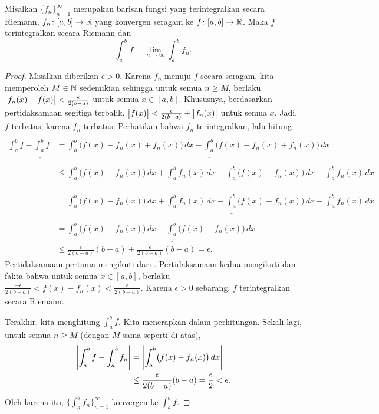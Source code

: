 \begin{thm} \label{integralinterchange:thm}
Misalkan $\{ f_n \}_{n=1}^\infty$ merupakan barisan fungsi yang terintegralkan secara Riemann,
$f_n \colon [a,b] \to {\mathbb{R}}$
yang konvergen seragam ke $f \colon [a,b]
\to {\mathbb{R}}$.  Maka $f$ terintegralkan secara Riemann dan
\begin{equation*}
\int_a^b f = \lim_{n\to\infty} \int_a^b f_n .
\end{equation*}
\end{thm}

\begin{proof}
Misalkan diberikan $\epsilon > 0$.
Karena $f_n$ menuju $f$ secara seragam, kita memperoleh $M \in {\mathbb{N}}$ sedemikian sehingga
untuk semua $n \geq M$, berlaku
$\bigl\lvert {f_n(x)-f(x)} \bigr\rvert < \frac{\epsilon}{2(b-a)}$ untuk semua $x \in [a,b]$.
Khususnya, berdasarkan pertidaksamaan segitiga terbalik,
$\bigl\lvert {f(x)} \bigr\rvert < \frac{\epsilon}{2(b-a)} + \bigl\lvert {f_n(x)} \bigr\rvert$ untuk semua $x$.
Jadi, $f$ terbatas,
karena $f_n$ terbatas.
Perhatikan bahwa $f_n$ terintegralkan, lalu hitung
\begin{equation*}
\begin{split}
\overline{\int_a^b} f
-
\underline{\int_a^b} f
& =
\overline{\int_a^b} \bigl( f(x) - f_n(x) + f_n(x) \bigr)\,dx
-
\underline{\int_a^b} \bigl( f(x) - f_n(x) + f_n(x) \bigr)\,dx
\\
& \leq
\overline{\int_a^b} \bigl( f(x) - f_n(x) \bigr)\,dx +  \overline{\int_a^b} f_n(x) \,dx
-
\underline{\int_a^b} \bigl( f(x) - f_n(x) \bigr)\,dx -  \underline{\int_a^b} f_n(x) \,dx
\\
& =
\overline{\int_a^b} \bigl( f(x) - f_n(x) \bigr)\,dx +  \int_a^b f_n(x) \,dx
-
\underline{\int_a^b} \bigl( f(x) - f_n(x) \bigr)\,dx -  \int_a^b f_n(x) \,dx
\\
& =
\overline{\int_a^b} \bigl( f(x) - f_n(x) \bigr)\,dx
-
\underline{\int_a^b} \bigl( f(x) - f_n(x) \bigr)\,dx
\\
& \leq
\frac{\epsilon}{2(b-a)} (b-a) + 
\frac{\epsilon}{2(b-a)} (b-a) = \epsilon .
\end{split}
\end{equation*}
Pertidaksamaan pertama mengikuti dari .
Pertidaksamaan kedua mengikuti  dan
fakta bahwa untuk semua $x \in [a,b]$, berlaku
$\frac{-\epsilon}{2(b-a)} < f(x)-f_n(x) < \frac{\epsilon}{2(b-a)}$.
Karena $\epsilon > 0$ sebarang, $f$ terintegralkan secara Riemann.

Terakhir, kita menghitung $\int_a^b f$.  Kita menerapkan 
dalam perhitungan.  Sekali lagi, untuk semua $n \geq M$ (dengan $M$ sama seperti di atas),
\begin{equation*}
\begin{split}
\left\lvert {\int_a^b f - \int_a^b f_n} \right\rvert & = 
\left\lvert { \int_a^b \bigl(f(x) - f_n(x)\bigr)\,dx} \right\rvert
\\
& \leq
\frac{\epsilon}{2(b-a)} (b-a) = \frac{\epsilon}{2} < \epsilon .
\end{split}
\end{equation*}
Oleh karena itu, $\bigl\{ \int_a^b f_n \bigr\}_{n=1}^\infty$ konvergen ke $\int_a^b f$.
\end{proof}

